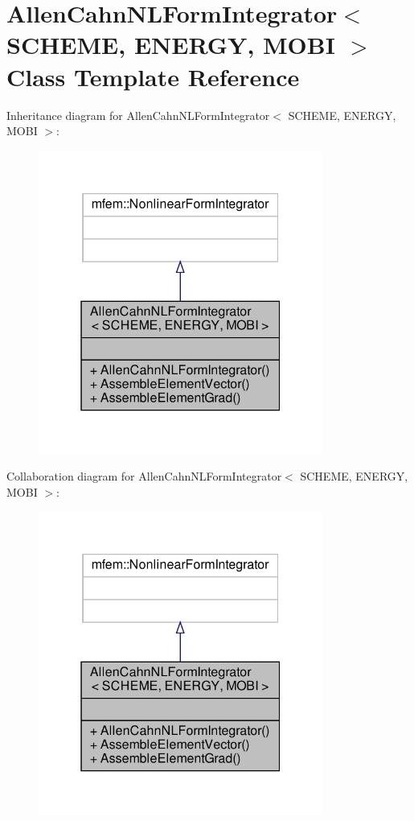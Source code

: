 \hypertarget{classAllenCahnNLFormIntegrator}{}\section{Allen\+Cahn\+N\+L\+Form\+Integrator$<$ S\+C\+H\+E\+ME, E\+N\+E\+R\+GY, M\+O\+BI $>$ Class Template Reference}
\label{classAllenCahnNLFormIntegrator}


Inheritance diagram for Allen\+Cahn\+N\+L\+Form\+Integrator$<$ S\+C\+H\+E\+ME, E\+N\+E\+R\+GY, M\+O\+BI $>$\+:\nopagebreak
\begin{figure}[H]
\begin{center}
\leavevmode
\includegraphics[width=265pt]{classAllenCahnNLFormIntegrator__inherit__graph}
\end{center}
\end{figure}


Collaboration diagram for Allen\+Cahn\+N\+L\+Form\+Integrator$<$ S\+C\+H\+E\+ME, E\+N\+E\+R\+GY, M\+O\+BI $>$\+:\nopagebreak
\begin{figure}[H]
\begin{center}
\leavevmode
\includegraphics[width=265pt]{classAllenCahnNLFormIntegrator__coll__graph}
\end{center}
\end{figure}
